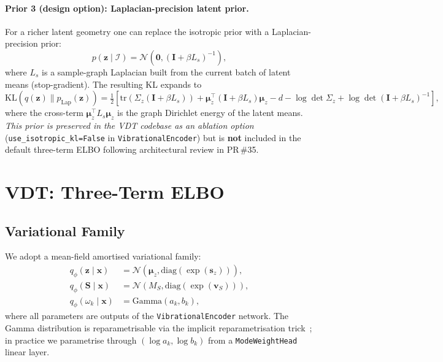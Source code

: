 \documentclass[11pt,a4paper]{article}
\newcommand{\KL}{\mathrm{KL}}
\newcommand{\N}{\mathcal{N}}
\newcommand{\I}{\mathcal{I}}
\newcommand{\diag}{\mathrm{diag}}
\newcommand{\tr}{\mathrm{tr}}
\newcommand{\bS}{\bm{S}}
\newcommand{\bz}{\bm{z}}
\newcommand{\bmu}{\bm{\mu}}
\newcommand{\bx}{\bm{x}}
\begin{document}
\paragraph{Prior 3 (design option): Laplacian-precision latent prior.}
For a richer latent geometry one can replace the isotropic prior with a
Laplacian-precision prior:
\begin{equation}
  p(\bz\mid\I) = \N(\mathbf{0}, (\bm{I}+\beta L_s)^{-1}),
  \label{eq:prior_z_lap}
\end{equation}
where $L_s$ is a sample-graph Laplacian built from the current batch of latent
means (stop-gradient).  The resulting KL expands to
\begin{equation}
  \KL(q(\bz)\|p_{\mathrm{Lap}}(\bz)) = \tfrac{1}{2}\!
  \left[
    \tr(\Sigma_z(\bm{I}{+}\beta L_s))
    + \bmu_z^\top(\bm{I}{+}\beta L_s)\bmu_z
    - d
    - \log\det\Sigma_z
    + \log\det(\bm{I}{+}\beta L_s)^{-1}
  \right],
  \label{eq:kl_lap}
\end{equation}
where the cross-term $\bmu_z^\top L_s\bmu_z$ is the graph Dirichlet energy of
the latent means.  \emph{This prior is preserved in the VDT codebase as an
ablation option} (\texttt{use\_isotropic\_kl=False} in
\texttt{VibrationalEncoder}) but is \textbf{not} included in the default
three-term ELBO following architectural review in PR\,\#35.

\section{VDT: Three-Term ELBO}
\label{sec:elbo}

\subsection{Variational Family}

We adopt a mean-field amortised variational family:
\begin{align}
  q_\phi(\bz\mid\bx) &= \N(\bmu_z, \diag(\exp(\bm{s}_z))), \\
  q_\phi(\bS\mid\bx) &= \N(M_S, \diag(\exp(\bm{v}_S))), \\
  q_\phi(\omega_k\mid\bx) &= \mathrm{Gamma}(a_k, b_k),
\end{align}
where all parameters are outputs of the \texttt{VibrationalEncoder} network.
The Gamma distribution is reparametrisable via the implicit reparametrisation
trick~\citep{figurnov2018implicit}; in practice we parametrise through
$(\log a_k, \log b_k)$ from a \texttt{ModeWeightHead} linear layer.
\end{document}
